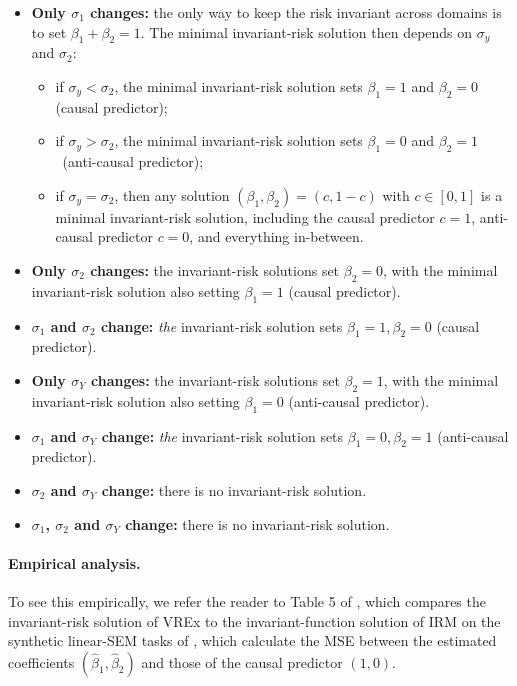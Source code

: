 \documentclass{article}
\begin{document}
\begin{itemize}\vspace{-2mm}
    \item \textbf{Only $\sigma_1$ changes:} the only way to keep the risk invariant across domains is to set $\beta_1 + \beta_2 = 1$. The minimal invariant-risk solution then depends on $\sigma_y$ and  $\sigma_2$:
    \begin{itemize}
        \item if $\sigma_y < \sigma_2$, the minimal invariant-risk solution sets $\beta_1 = 1$ and $\beta_2 = 0$  (causal predictor);
        \item if $\sigma_y > \sigma_2$, the minimal invariant-risk solution sets $\beta_1 = 0$ and $\beta_2 = 1$~(anti-causal predictor);
        \item if $\sigma_y = \sigma_2$, then any solution $(\beta_1, \beta_2)\! =\! (c, 1\! -\! c)$ with  $c\in[0,1]$ is a minimal invariant-risk solution, including the causal predictor $c\! =\! 1$, anti-causal predictor $c\! =\! 0$, and everything in-between. 
    \end{itemize}
    \item \textbf{Only $\sigma_2$ changes:} the invariant-risk solutions set $\beta_2 = 0$, with the minimal invariant-risk solution also setting $\beta_1 = 1$ (causal predictor).
    \item \textbf{$\sigma_1$ and $\sigma_2$ change:} \textit{the} invariant-risk solution sets $\beta_1=1, \beta_2=0$ (causal predictor).
    \item \textbf{Only $\sigma_Y$ changes:} the invariant-risk solutions set $\beta_2 = 1$, with the minimal invariant-risk solution also setting $\beta_1=0$ (anti-causal predictor).
    \item \textbf{$\sigma_1$ and $\sigma_Y$ change:} \textit{the} invariant-risk solution sets $\beta_1\! =\! 0, \beta_2\! =\! 1$ (anti-causal predictor).
    \item \textbf{$\sigma_2$ and $\sigma_Y$ change:} there is no invariant-risk solution.
    \item \textbf{$\sigma_1$, $\sigma_2$ and $\sigma_Y$ change:} there is no invariant-risk solution.
\end{itemize}

%
%
%
%

\paragraph{Empirical analysis.} To see this empirically, we refer the reader to Table 5 of \citet[App.~G.2]{krueger21rex}, which compares the invariant-risk solution of VREx to the invariant-function solution of IRM on the synthetic linear-SEM tasks of \citet[Sec.~5.1]{arjovsky2020invariant}, which calculate the MSE between the estimated coefficients $(\hat{\beta}_1, \hat{\beta}_2)$ and those of the causal predictor $(1, 0)$.
\end{document}
